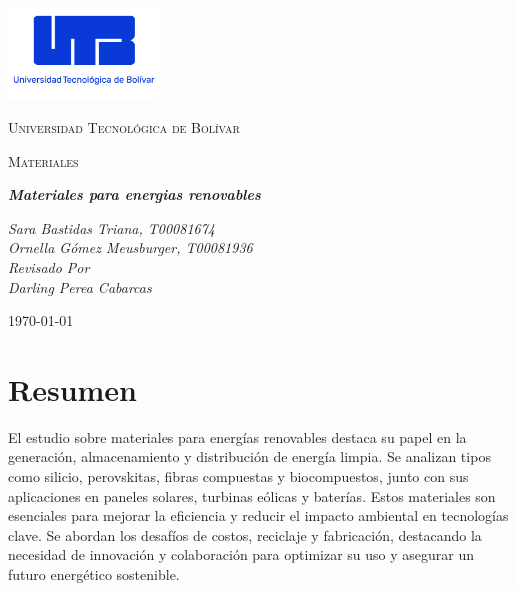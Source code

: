 \documentclass[letterpaper, 12pt]{article}
\begin{document}
\begin{titlepage}
      \centering
      \includegraphics[width=0.3\textwidth]{Images/logo_utb.png}\par\vspace{1cm}
      {\scshape\LARGE Universidad Tecnológica de Bolívar \par}
      \vspace{1cm}

      {\scshape\Large Materiales \par}
      \vspace{1cm}

      \slshape {\Large \bfseries{}Materiales para energias renovables\\}
      \vspace{4cm}

      \slshape {\itshape{} Sara Bastidas Triana, T00081674 \\}
      \slshape {\itshape{} Ornella Gómez Meusburger, T00081936 \\}
      \vfill
      Revisado Por \\
      Darling Perea Cabarcas\\
      {\large \today\par}
\end{titlepage}

\nocite{*}


\section{Resumen}

El estudio sobre materiales para energías renovables destaca su papel en la
generación, almacenamiento y distribución de energía limpia. Se analizan tipos
como silicio, perovskitas, fibras compuestas y biocompuestos, junto con sus
aplicaciones en paneles solares, turbinas eólicas y baterías. Estos materiales
son esenciales para mejorar la eficiencia y reducir el impacto ambiental en
tecnologías clave. Se abordan los desafíos de costos, reciclaje y fabricación,
destacando la necesidad de innovación y colaboración para optimizar su uso y
asegurar un futuro energético sostenible.
\end{document}
